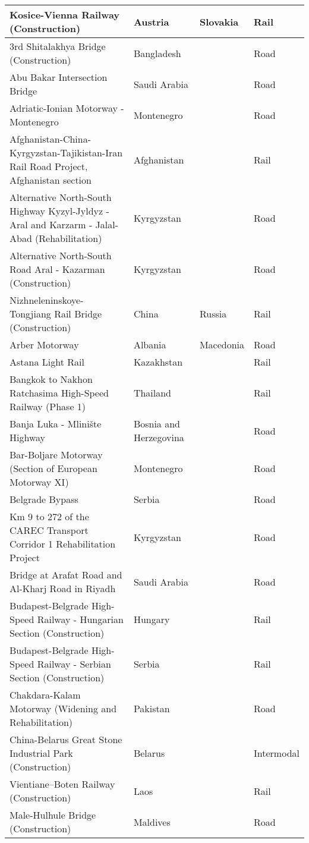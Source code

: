 \documentclass{article}
\begin{document}
\begin{center}
\begin{landscape}
\begin{longtable}{p{10cm}p{5cm}p{2cm}p{2cm}}
Kosice-Vienna Railway (Construction)	&	Austria	&	Slovakia	&	Rail	\\	\hline
3rd Shitalakhya Bridge (Construction)	&	Bangladesh	&		&	Road	\\	\hline
Abu Bakar Intersection Bridge	&	Saudi Arabia	&		&	Road	\\	\hline
Adriatic-Ionian Motorway - Montenegro	&	Montenegro	&		&	Road	\\	\hline
Afghanistan-China-Kyrgyzstan-Tajikistan-Iran Rail Road Project, Afghanistan section	&	Afghanistan	&		&	Rail	\\	\hline
Alternative North-South Highway Kyzyl-Jyldyz - Aral and Karzarm - Jalal-Abad (Rehabilitation)	&	Kyrgyzstan	&		&	Road	\\	\hline
Alternative North-South Road Aral - Kazarman (Construction)	&	Kyrgyzstan	&		&	Road	\\	\hline
Nizhneleninskoye-Tongjiang Rail Bridge (Construction)	&	China 	&	Russia	&	Rail	\\	\hline
Arber Motorway	&	Albania	&	Macedonia	&	Road	\\	\hline
Astana Light Rail	&	Kazakhstan	&		&	Rail	\\	\hline
Bangkok to Nakhon Ratchasima High-Speed Railway (Phase 1)	&	Thailand	&		&	Rail	\\	\hline
Banja Luka - Mlinište Highway	&	Bosnia and Herzegovina	&		&	Road	\\	\hline
Bar-Boljare Motorway (Section of European Motorway XI)	&	Montenegro	&		&	Road	\\	\hline
Belgrade Bypass	&	Serbia	&		&	Road	\\	\hline
Km 9 to 272 of the CAREC Transport Corridor 1 Rehabilitation Project	&	Kyrgyzstan	&		&	Road	\\	\hline
Bridge at Arafat Road and Al-Kharj Road in Riyadh	&	Saudi Arabia	&		&	Road	\\	\hline
Budapest-Belgrade High-Speed Railway - Hungarian Section (Construction)	&	Hungary	&		&	Rail	\\	\hline
Budapest-Belgrade High-Speed Railway - Serbian Section (Construction)	&	Serbia	&		&	Rail	\\	\hline
Chakdara-Kalam Motorway (Widening and Rehabilitation)	&	Pakistan	&		&	Road	\\	\hline
China-Belarus Great Stone Industrial Park (Construction)	&	Belarus	&		&	Intermodal	\\	\hline
Vientiane–Boten Railway (Construction)	&	Laos	&		&	Rail	\\	\hline
Male-Hulhule Bridge (Construction)	&	Maldives	&		&	Road	\\	\hline

\end{longtable}
\end{landscape}
\end{center}
\end{document}
